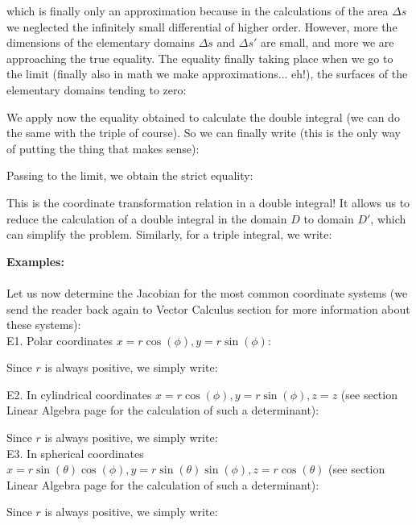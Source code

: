 	which is finally only an approximation because in the calculations of the area $\Delta s$ we neglected the infinitely small differential of higher order. However, more the dimensions of the elementary domains $\Delta s$ and $\Delta s'$ are small, and more we are approaching the true equality. The equality finally taking place when we go to the limit (finally also in math we make approximations... eh!), the surfaces of the elementary domains tending to zero:
	
	We apply now the equality obtained to calculate the double integral (we can do the same with the triple of course). So we can finally write (this is the only way of putting the thing that makes sense):
	
	Passing to the limit, we obtain the strict equality:
	
	This is the coordinate transformation relation in a double integral! It allows us to reduce the calculation of a double integral in the domain $D$ to domain $D'$, which can simplify the problem.
	Similarly, for a triple integral, we write:
	
	
	\begin{tcolorbox}[colframe=black,colback=white,sharp corners]
	\textbf{{\Large {}}Examples:}\\\\
	Let us now determine the Jacobian for the most common coordinate systems (we send the reader back again to Vector Calculus section for more information about these systems):\\
	
	E1. Polar coordinates\label{jacobian in polar coordinates} $x=r\cos(\phi),y=r\sin(\phi)$:
	
	Since $r$ is always positive, we simply write:
	
	\end{tcolorbox}
	\pagebreak
	
	\begin{tcolorbox}[colframe=black,colback=white,sharp corners]
	E2. In cylindrical coordinates $x=r\cos(\phi),y=r\sin(\phi),z=z$ (see section Linear Algebra  page \pageref{determinant} for the calculation of such a determinant):
	
	Since $r$ is always positive, we simply write:
	\\
	
	E3. \label{jacobian spherical coordinates}In spherical coordinates $x=r\sin(\theta)\cos(\phi),y=r\sin(\theta)\sin(\phi),z=r\cos(\theta)$ (see section Linear Algebra  page \pageref{determinant} for the calculation of such a determinant):
	
	Since $r$ is always positive, we simply write:
	
	\end{tcolorbox}

